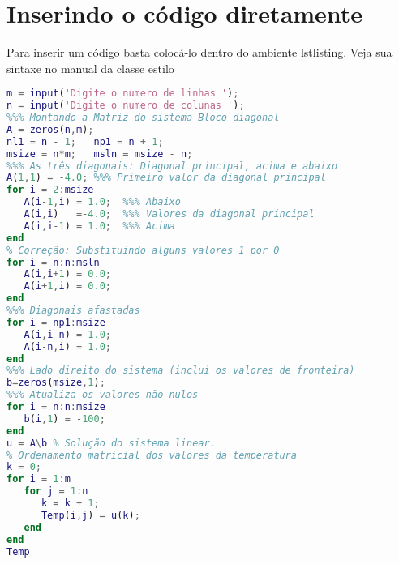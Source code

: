 \section{Inserindo o código diretamente}

Para inserir um código basta colocá-lo dentro do ambiente \textsf{lstlisting}. Veja sua sintaxe no manual da classe estilo

\begin{tcolorbox}[breakable,title={Código posto dentro de um ambiente lstlisting}]
\begin{lstlisting}[language=Matlab,
caption={Exemplo de inclusão de código},captionpos=b]
m = input('Digite o numero de linhas ');
n = input('Digite o numero de colunas ');
%%% Montando a Matriz do sistema Bloco diagonal
A = zeros(n,m);
nl1 = n - 1;   np1 = n + 1;  
msize = n*m;   msln = msize - n;
%%% As três diagonais: Diagonal principal, acima e abaixo
A(1,1) = -4.0; %%% Primeiro valor da diagonal principal
for i = 2:msize
   A(i-1,i) = 1.0;  %%% Abaixo
   A(i,i)   =-4.0;  %%% Valores da diagonal principal
   A(i,i-1) = 1.0;  %%% Acima
end
% Correção: Substituindo alguns valores 1 por 0
for i = n:n:msln
   A(i,i+1) = 0.0;
   A(i+1,i) = 0.0;
end
%%% Diagonais afastadas
for i = np1:msize
   A(i,i-n) = 1.0;
   A(i-n,i) = 1.0;
end
%%% Lado direito do sistema (inclui os valores de fronteira)
b=zeros(msize,1);
%%% Atualiza os valores não nulos
for i = n:n:msize
   b(i,1) = -100;
end
u = A\b % Solução do sistema linear.
% Ordenamento matricial dos valores da temperatura
k = 0;
for i = 1:m
   for j = 1:n
      k = k + 1;
      Temp(i,j) = u(k);
   end
end
Temp
\end{lstlisting}
\end{tcolorbox}




